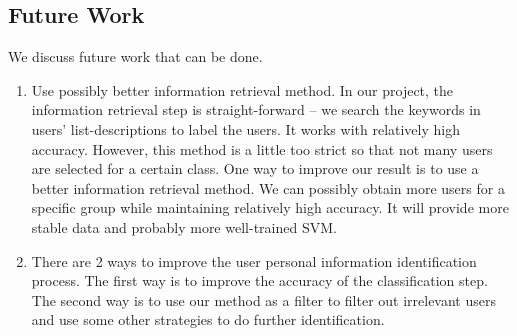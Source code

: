 \subsection{Future Work}
We discuss future work that can be done.
\begin{enumerate}
\item Use possibly better information retrieval method. In our project, the information retrieval step is straight-forward -- we search the keywords in users' list-descriptions to label the users. It works with relatively high accuracy. However, this method is a little too strict so that not many users are selected for a certain class. One way to improve our result is to use a better information retrieval method. We can possibly obtain more users for a specific group while maintaining relatively high accuracy. It will provide more stable data and probably more well-trained SVM.
\item There are 2 ways to improve the user personal information identification process. The first way is to improve the accuracy of the classification step. The second way is to use our method as a filter to filter out irrelevant users and use some other strategies to do further identification.
\end{enumerate}
